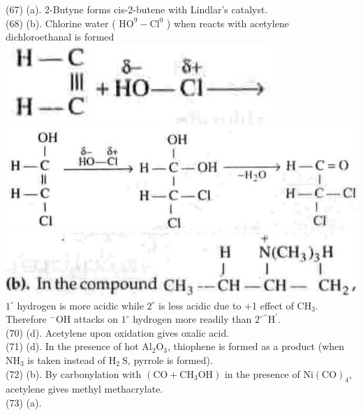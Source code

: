 \documentclass[10pt]{article}
\begin{document}
(67) (a). 2-Butyne forms cis-2-butene with Lindlar's catalyst.\\
(68) (b). Chlorine water ( $\mathrm{HO}^{9}-\mathrm{Cl}^{0}$ ) when reacts with acetylene dichloroethanal is formed\\
\includegraphics[max width=\textwidth, center]{2025_01_28_8470952b98110cec3aabg-243(4)}\\
\includegraphics[max width=\textwidth, center]{2025_01_28_8470952b98110cec3aabg-243(9)}\\
\includegraphics[max width=\textwidth]{2025_01_28_8470952b98110cec3aabg-244(2)} $1^{\circ}$ hydrogen is more acidic while $2^{\circ}$ is less acidic due to +1 effect of $\mathrm{CH}_{3}$. Therefore ${ }^{-} \mathrm{OH}$ attacks on $1^{\circ}$ hydrogen more readily than $2^{\circ}{ }^{\prime \prime} \mathrm{H}^{\prime}$.\\
(70) (d). Acetylene upon oxidation gives oxalic acid.\\
(71) (d). In the presence of hot $\mathrm{Al}_{2} \mathrm{O}_{3}$, thiophene is formed as a product (when $\mathrm{NH}_{3}$ is taken instead of $\mathrm{H}_{2} \mathrm{~S}$, pyrrole is formed).\\
(72) (b). By carbonylation with $\left(\mathrm{CO}+\mathrm{CH}_{3} \mathrm{OH}\right)$ in the presence of $\mathrm{Ni}(\mathrm{CO})_{4}$, acetylene gives methyl methacrylate.\\
(73) (a).\\
\end{document}

